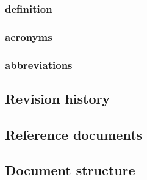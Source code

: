 \subsubsection{definition}
\subsubsection{acronyms}
\subsubsection{abbreviations}

\subsection{Revision history}
\subsection{Reference documents}
\subsection{Document structure}

